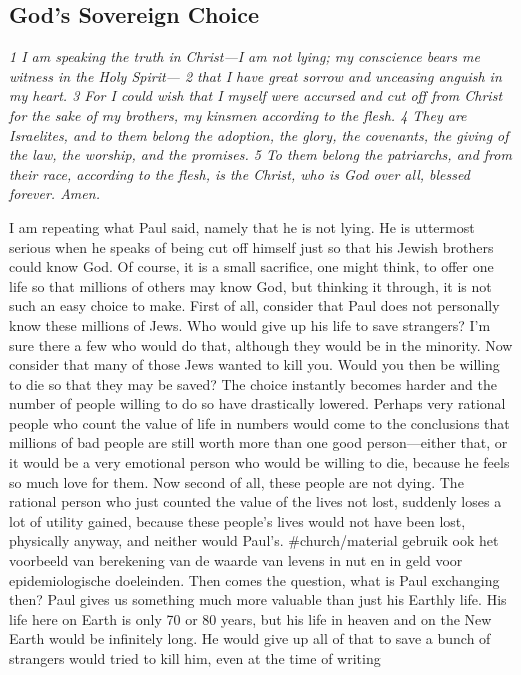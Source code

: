 \subsection{God's Sovereign Choice} \emph{1 I am speaking the truth in
Christ---I am not lying; my conscience bears me witness in the Holy
Spirit--- 2 that I have great sorrow and unceasing anguish in my heart.
3 For I could wish that I myself were accursed and cut off from Christ
for the sake of my brothers, my kinsmen according to the flesh. 4 They
are Israelites, and to them belong the adoption, the glory, the
covenants, the giving of the law, the worship, and the promises. 5 To
them belong the patriarchs, and from their race, according to the flesh,
is the Christ, who is God over all, blessed forever. Amen.}

I am repeating what Paul said, namely that he is not lying. He is
uttermost serious when he speaks of being cut off himself just so that
his Jewish brothers could know God. Of course, it is a small sacrifice,
one might think, to offer one life so that millions of others may know
God, but thinking it through, it is not such an easy choice to make.
First of all, consider that Paul does not personally know these millions
of Jews. Who would give up his life to save strangers? I'm sure there a
few who would do that, although they would be in the minority. Now
consider that many of those Jews wanted to kill you. Would you then be
willing to die so that they may be saved? The choice instantly becomes
harder and the number of people willing to do so have drastically
lowered. Perhaps very rational people who count the value of life in
numbers would come to the conclusions that millions of bad people are
still worth more than one good person---either that, or it would be a
very emotional person who would be willing to die, because he feels so
much love for them. Now second of all, these people are not dying. The
rational person who just counted the value of the lives not lost,
suddenly loses a lot of utility gained, because these people's lives
would not have been lost, physically anyway, and neither would Paul's.
\#church/material gebruik ook het voorbeeld van berekening van de waarde
van levens in nut en in geld voor epidemiologische doeleinden. Then
comes the question, what is Paul exchanging then? Paul gives us
something much more valuable than just his Earthly life. His life here
on Earth is only 70 or 80 years, but his life in heaven and on the New
Earth would be infinitely long. He would give up all of that to save a
bunch of strangers would tried to kill him, even at the time of writing
